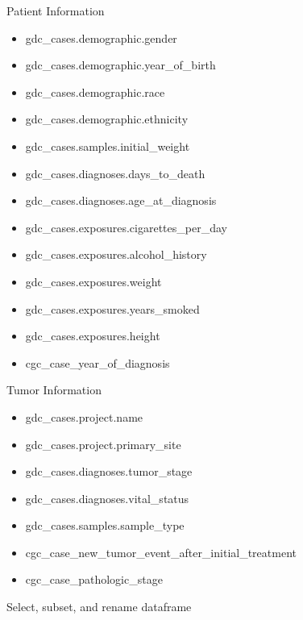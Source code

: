 \documentclass[11pt]{article}
\providecommand{\tightlist}{%
      \setlength{\itemsep}{0pt}\setlength{\parskip}{0pt}}
\begin{document}
Patient Information

\begin{itemize}
\tightlist
\item
  gdc\_cases.demographic.gender
\item
  gdc\_cases.demographic.year\_of\_birth
\item
  gdc\_cases.demographic.race
\item
  gdc\_cases.demographic.ethnicity
\item
  gdc\_cases.samples.initial\_weight
\item
  gdc\_cases.diagnoses.days\_to\_death
\item
  gdc\_cases.diagnoses.age\_at\_diagnosis
\item
  gdc\_cases.exposures.cigarettes\_per\_day\\
\item
  gdc\_cases.exposures.alcohol\_history
\item
  gdc\_cases.exposures.weight
\item
  gdc\_cases.exposures.years\_smoked
\item
  gdc\_cases.exposures.height
\item
  cgc\_case\_year\_of\_diagnosis
\end{itemize}

Tumor Information

\begin{itemize}
\tightlist
\item
  gdc\_cases.project.name
\item
  gdc\_cases.project.primary\_site
\item
  gdc\_cases.diagnoses.tumor\_stage
\item
  gdc\_cases.diagnoses.vital\_status
\item
  gdc\_cases.samples.sample\_type
\item
  cgc\_case\_new\_tumor\_event\_after\_initial\_treatment
\item
  cgc\_case\_pathologic\_stage
\end{itemize}

    Select, subset, and rename dataframe
\end{document}
